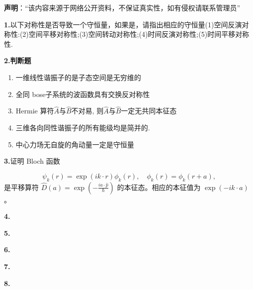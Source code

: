 
\textbf{声明}：“该内容来源于网络公开资料，不保证真实性，如有侵权请联系管理员”

\textbf{1.}以下对称性是否导致一个守恒量，如果是，请指出相应的守恒量(1)空间反演对称性:(2)空间平移对称性;(3)空间转动对称性;(4)时间反演对称性;(5)时间平移对称性.

\textbf{2.判断题}
\begin{enumerate}
\item 一维线性谐振子的是子态空间是无穷维的
\item 全同 bose子系统的波函数具有交换反对称性
\item Hermie 算符$\hat{A}$与$\hat{B}$不对易, 则$\hat{A}$与$\hat{B}$一定无共同本征态
\item 三维各向同性谐振子的所有能级均是简并的.
\item 中心力场无自旋的角动量一定是守恒量
\end{enumerate}

\textbf{3.}证明 Bloch 函数

\[
\psi_k(r) = \exp(ik \cdot r)\phi_k(r), \quad \phi_k(r) = \phi_k(r + a),
\]
是平移算符 $\hat{D}(a) = \exp\left(-\frac{ia \cdot \hat{p}}{\hbar}\right)$ 的本征态。相应的本征值为 $\exp(-ik \cdot a)$。


\textbf{4.}

\textbf{5.}

\textbf{6.}

\textbf{7.}

\textbf{8.}